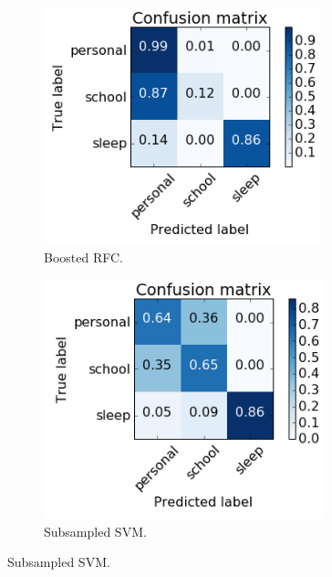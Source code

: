 \documentclass[a4paper, 12pt]{article}
\begin{document}
\begin{figure}[h!]
\centering
\begin{subfigure}{.3\textwidth}
  \centering
  \includegraphics[width=1\linewidth]{3class-cm-boost.png}
  \caption{Boosted RFC.}
\end{subfigure}%
\begin{subfigure}{.3\textwidth}
  \centering
  \includegraphics[width=1\linewidth]{3class-ss-cm-svm.png}
  \caption{Subsampled SVM.}
\end{subfigure}%

\end{figure}
\end{document}

